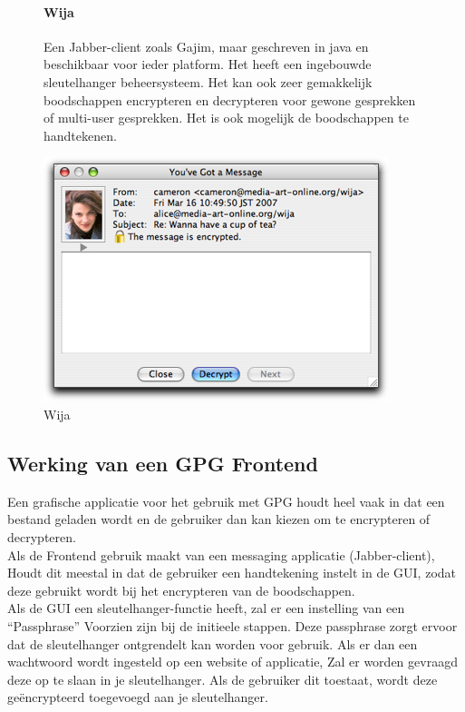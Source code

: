 \documentclass[12pt]{article}
\begin{document}
				\begin{figure}[!ht]				
					\paragraph{Wija}
						Een Jabber-client zoals Gajim, maar geschreven in java en beschikbaar voor ieder platform.
						Het heeft een ingebouwde sleutelhanger beheersysteem. Het kan ook zeer gemakkelijk boodschappen encrypteren en decrypteren voor gewone gesprekken of 													multi-user gesprekken.
						Het is ook mogelijk de boodschappen te handtekenen.
					\begin{center}
						\includegraphics[scale=0.7]{Pictures/wija}
					\end{center}
					\caption{Wija}
				\end{figure}
				
		\subsection{Werking van een GPG Frontend}\label{Frontend}
			Een grafische applicatie voor het gebruik met GPG houdt heel vaak in dat een bestand
			geladen wordt en de gebruiker dan kan kiezen om te encrypteren of decrypteren.\\
			Als de Frontend gebruik maakt van een messaging applicatie (Jabber-client),
			Houdt dit meestal in dat de gebruiker een handtekening instelt in de GUI,
			zodat deze gebruikt wordt bij het encrypteren van de boodschappen.\\
			Als de GUI een sleutelhanger-functie heeft, zal er een instelling van een \textquotedblleft Passphrase\textquotedblright
			Voorzien zijn bij de initieele stappen. Deze passphrase zorgt ervoor dat de sleutelhanger
			ontgrendelt kan worden voor gebruik. Als er dan een wachtwoord wordt ingesteld op een
			website of applicatie, Zal er worden gevraagd deze op te slaan in je sleutelhanger.
			Als de gebruiker dit toestaat, wordt deze ge\"encrypteerd toegevoegd aan je sleutelhanger.
			
\end{document}
